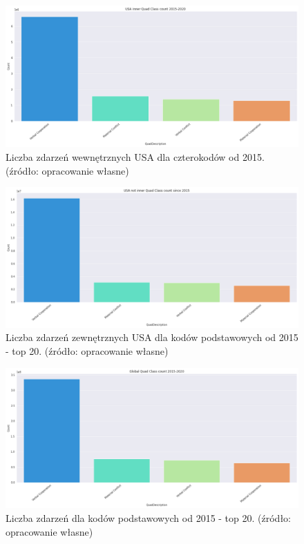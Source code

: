 \documentclass[11pt]{report}
\begin{document}
    \begin{figure}[!htp]
        \centering
        \includegraphics[width=\linewidth]{fig/USA inner/QC.png}
        \caption{Liczba zdarzeń wewnętrznych USA dla czterokodów od 2015. (źródło: opracowanie własne)}
        \label{fig:USA_inner_QC}
    \end{figure}


    \begin{figure}[!htp]
        \centering
        \includegraphics[width=\linewidth]{fig/USA not inner/QC.png}
        \caption{Liczba zdarzeń zewnętrznych USA dla kodów podstawowych od 2015 - top 20. (źródło: opracowanie własne)}
        \label{fig:USA_not_inner_QC}
    \end{figure}


    \begin{figure}[!htp]
        \centering
        \includegraphics[width=\linewidth]{fig/GLOBAL//QC.png}
        \caption{Liczba zdarzeń dla kodów podstawowych od 2015 - top 20. (źródło: opracowanie własne)}
        \label{fig:GLOBAL_QC}
    \end{figure}
\end{document}
